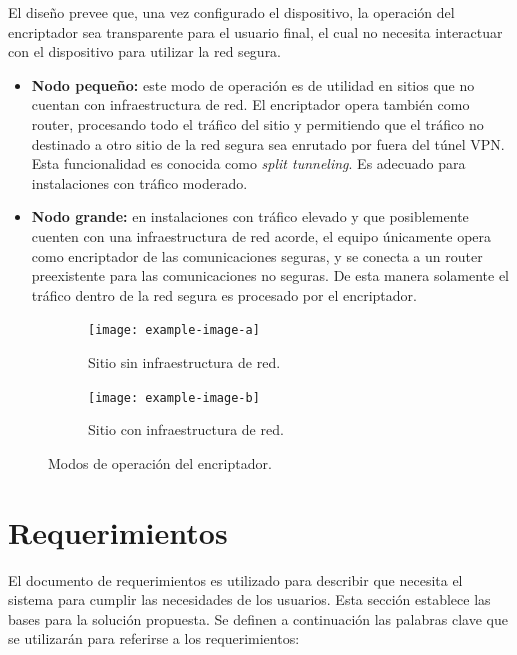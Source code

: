 El diseño prevee que, una vez configurado el dispositivo, la operación del encriptador sea transparente para el usuario final, el cual no necesita interactuar con el dispositivo para utilizar la red segura.
\begin{itemize}
    \item \textbf{Nodo pequeño:} este modo de operación es de utilidad en sitios que no cuentan con infraestructura de red. El encriptador opera también como router, procesando todo el tráfico del sitio y permitiendo que el tráfico no destinado a otro sitio de la red segura sea enrutado por fuera del túnel VPN. Esta funcionalidad es conocida como \textit{split tunneling}. Es adecuado para instalaciones con tráfico moderado.
    \item \textbf{Nodo grande:} en instalaciones con tráfico elevado y que posiblemente cuenten con una infraestructura de red acorde, el equipo únicamente opera como encriptador de las comunicaciones seguras, y se conecta a un router preexistente para las comunicaciones no seguras. De esta manera solamente el tráfico dentro de la red segura es procesado por el encriptador.
\end{itemize}

\begin{figure}[h!]
    \begin{subfigure}{0.45\textwidth}
        \centering
        \texttt{[image: example-image-a]}
        \caption{Sitio sin infraestructura de red.}
        \label{fig:small_node}
    \end{subfigure}
    \hfill
    \begin{subfigure}{0.45\textwidth}
        \centering
        \texttt{[image: example-image-b]}
        \caption{Sitio con infraestructura de red.}
        \label{fig:large_node}
    \end{subfigure}
    \caption{Modos de operación del encriptador.}
    \label{fig:modes_of_operation}
\end{figure}

\section{Requerimientos}
El documento de requerimientos es utilizado para describir que necesita el sistema para cumplir las necesidades de los usuarios. Esta sección establece las bases para la solución propuesta. Se definen a continuación las palabras clave que se utilizarán para referirse a los requerimientos:

